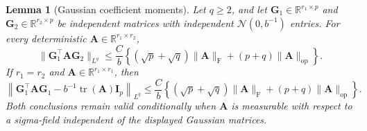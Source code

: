 \documentclass[11pt]{article}
\newtheorem{lemma}{Lemma}
\newcommand{\trans}{\top}
\begin{document}
\begin{lemma}[Gaussian coefficient moments]
\label{lem:gaussian-coefficient-moments}
Let $q\ge2$, and let
$\bm G_1\in\mathbb R^{r_1\times p}$ and
$\bm G_2\in\mathbb R^{r_2\times p}$ be independent matrices with independent
$\mathcal N(0,b^{-1})$ entries. For every deterministic
$\bm A\in\mathbb R^{r_1\times r_2}$,
\begin{equation}
\label{eq:gaussian-coefficient-moments}
  \|\bm G_1^\trans\bm A\bm G_2\|_{L^q}
  \le
  \frac{C}{b}
  \left\{
    (\sqrt p+\sqrt q)\|\bm A\|_{\mathrm F}
    +(p+q)\|\bm A\|_{\mathrm{op}}
  \right\}.
\end{equation}
If $r_1=r_2$ and $\bm A\in\mathbb R^{r_1\times r_1}$, then
\begin{equation}
\label{eq:gaussian-quadratic-moment}
  \left\|
    \bm G_1^\trans\bm A\bm G_1
    -b^{-1}\operatorname{tr}(\bm A)\bm I_p
  \right\|_{L^q}
  \le
  \frac{C}{b}
  \left\{
    (\sqrt p+\sqrt q)\|\bm A\|_{\mathrm F}
    +(p+q)\|\bm A\|_{\mathrm{op}}
  \right\}.
\end{equation}
Both conclusions remain valid conditionally when $\bm A$ is measurable with
respect to a sigma-field independent of the displayed Gaussian matrices.
\end{lemma}
\end{document}
